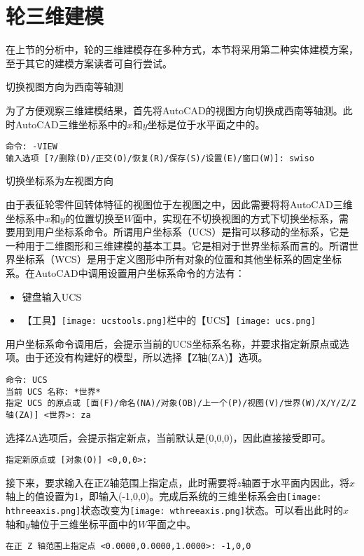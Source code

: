 \section{轮三维建模}\label{sec:lunjianmo}
在上节的分析中，轮的三维建模存在多种方式，本节将采用第二种实体建模方案，至于其它的建模方案读者可自行尝试。

\begin{procedure}
\item 切换视图方向为西南等轴测

为了方便观察三维建模结果，首先将AutoCAD的视图方向切换成西南等轴测。此时AutoCAD三维坐标系中的$x$和$y$坐标是位于水平面之中的。
\begin{lstlisting}
命令: -VIEW
输入选项 [?/删除(D)/正交(O)/恢复(R)/保存(S)/设置(E)/窗口(W)]: swiso
\end{lstlisting}

\item 切换坐标系为左视图方向

由于表征轮零件回转体特征的视图位于左视图之中，因此需要将将AutoCAD三维坐标系中$x$和$y$的位置切换至$W$面中，实现在不切换视图的方式下切换坐标系，需要用到用户坐标系命令。所谓用户坐标系（UCS）是指可以移动的坐标系，它是一种用于二维图形和三维建模的基本工具。它是相对于世界坐标系而言的。所谓世界坐标系（WCS）是用于定义图形中所有对象的位置和其他坐标系的固定坐标系。在AutoCAD中调用设置用户坐标系命令的方法有：

\begin{itemize}
\item 键盘输入UCS
\item 【工具】\texttt{[image: ucstools.png]}栏中的【UCS】\texttt{[image: ucs.png]}
\end{itemize}

用户坐标系命令调用后，会提示当前的UCS坐标系名称，并要求指定新原点或选项。由于还没有构建好的模型，所以选择【Z轴(ZA)】选项。
\begin{lstlisting}
命令: UCS
当前 UCS 名称: *世界*
指定 UCS 的原点或 [面(F)/命名(NA)/对象(OB)/上一个(P)/视图(V)/世界(W)/X/Y/Z/Z 轴(ZA)] <世界>: za
\end{lstlisting}
选择ZA选项后，会提示指定新点，当前默认是(0,0,0)，因此直接接受即可。
\begin{lstlisting}
指定新原点或 [对象(O)] <0,0,0>:
\end{lstlisting}
接下来，要求输入在正Z轴范围上指定点，此时需要将$z$轴置于水平面内因此，将$x$轴上的值设置为1，即输入(-1,0,0)。完成后系统的三维坐标系会由\texttt{[image: hthreeaxis.png]}状态改变为\texttt{[image: wthreeaxis.png]}状态。可以看出此时的$x$轴和$y$轴位于三维坐标平面中的$W$平面之中。
\begin{lstlisting}
在正 Z 轴范围上指定点 <0.0000,0.0000,1.0000>: -1,0,0
\end{lstlisting}


\end{procedure}

